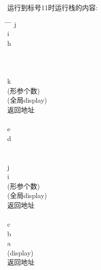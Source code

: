 \documentclass{article}
\begin{document}
运行到标号11时运行栈的内容:

\begin{tabbing}
    \hspace{1.5cm} \= \hspace{1.5cm} \= \hspace{1.5cm} \= \kill
     \> j\\

     \> i\\


     \> h\\

     \\

     \\

     \\

     \> k\\

     (形参个数)\\

     (全局display)\\

     \> 返回地址\\

     \\

     \> e\\

 \> d\\

 \\

 \\

 \> j\\

 \> i\\

 (形参个数)\\

 (全局display)\\

 \> 返回地址\\

 \\

 \> c\\

 \> b\\

 \> a\\

 (display)\\

 \> 返回地址\\

 \\

\end{tabbing}
\end{document}
